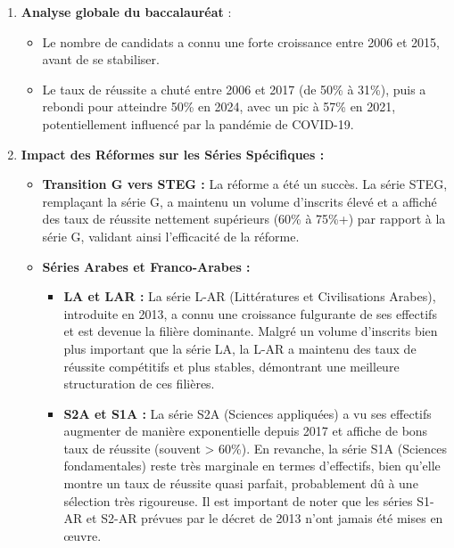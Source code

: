 \begin{enumerate}
    \item \textbf{Analyse globale du baccalauréat} :
    \begin{itemize}
        \item Le nombre de candidats a connu une forte croissance entre 2006 et 2015, avant de se stabiliser.
        \item Le taux de réussite a chuté entre 2006 et 2017 (de 50\% à 31\%), puis a rebondi pour atteindre 50\% en 2024, avec un pic à 57\% en 2021, potentiellement influencé par la pandémie de COVID-19.
    \end{itemize}
    \item \textbf{Impact des Réformes sur les Séries Spécifiques :}
    \begin{itemize}
        \item \textbf{Transition G vers STEG :} La réforme a été un succès. La série STEG, remplaçant la série G, a maintenu un volume d'inscrits élevé et a affiché des taux de réussite nettement supérieurs (60\% à 75\%+) par rapport à la série G, validant ainsi l'efficacité de la réforme.
        \item \textbf{Séries Arabes et Franco-Arabes :}
        \begin{itemize}
            \item \textbf{LA et LAR :} La série L-AR (Littératures et Civilisations Arabes), introduite en 2013, a connu une croissance fulgurante de ses effectifs et est devenue la filière dominante. Malgré un volume d'inscrits bien plus important que la série LA, la L-AR a maintenu des taux de réussite compétitifs et plus stables, démontrant une meilleure structuration de ces filières.
            \item \textbf{S2A et S1A :} La série S2A (Sciences appliquées) a vu ses effectifs augmenter de manière exponentielle depuis 2017 et affiche de bons taux de réussite (souvent > 60\%). En revanche, la série S1A (Sciences fondamentales) reste très marginale en termes d'effectifs, bien qu'elle montre un taux de réussite quasi parfait, probablement dû à une sélection très rigoureuse. Il est important de noter que les séries S1-AR et S2-AR prévues par le décret de 2013 n'ont jamais été mises en œuvre.
        \end{itemize}
    \end{itemize}
\end{enumerate}